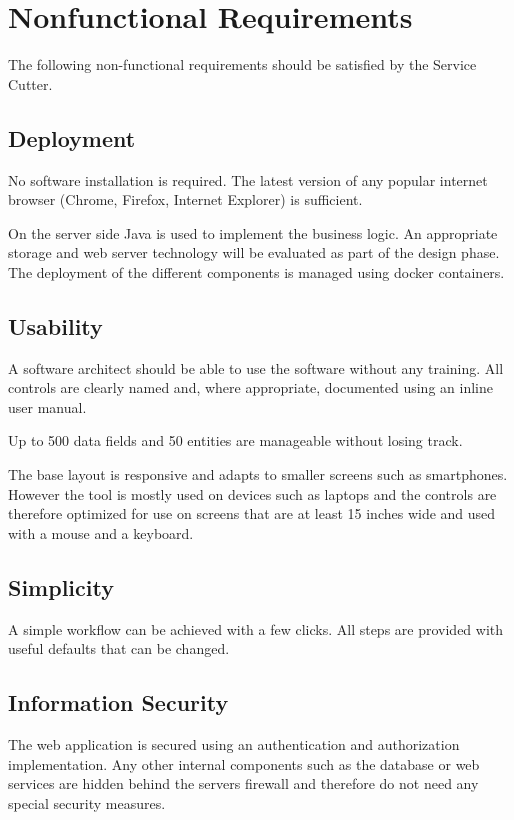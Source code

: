 \section{Nonfunctional Requirements}

The following non-functional requirements should be satisfied by the Service Cutter.

\subsection{Deployment}

No software installation is required. The latest version of any popular internet browser (Chrome, Firefox, Internet Explorer) is sufficient.

On the server side Java is used to implement the business logic. An appropriate storage and web server technology will be evaluated as part of the design phase. The deployment of the different components is managed using \gls{docker} containers.

\subsection{Usability}
\label{sec:usability}

A software architect should be able to use the software without any training. All controls are clearly named and, where appropriate, documented using an inline user manual.

Up to 500 data fields and 50 entities are manageable without losing track.

The base layout is responsive and adapts to smaller screens such as smartphones. However the tool is mostly used on devices such as laptops and the controls are therefore optimized for use on screens that are at least 15 inches wide and used with a mouse and a keyboard.

\subsection{Simplicity}

A simple workflow can be achieved with a few clicks. All steps are provided with useful defaults that can be changed.

\subsection{Information Security}

The web application is secured using an authentication and authorization implementation. Any other internal components such as the database or web services are hidden behind the servers firewall and therefore do not need any special security measures.

